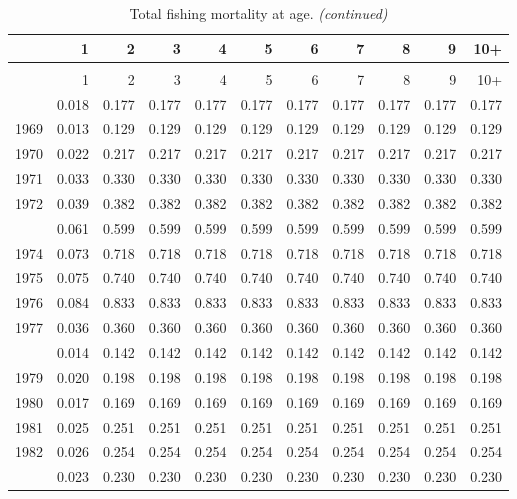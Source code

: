 \documentclass[
]{article}
\begin{document}
\begin{longtable}[t]{lrrrrrrrrrr}
\caption{\label{tab:FAA-tot-table}Total fishing mortality at age.}\\
\toprule
  & 1 & 2 & 3 & 4 & 5 & 6 & 7 & 8 & 9 & 10+\\
\midrule
\endfirsthead
\caption[]{Total fishing mortality at age. \textit{(continued)}}\\
\toprule
  & 1 & 2 & 3 & 4 & 5 & 6 & 7 & 8 & 9 & 10+\\
\midrule
\endhead

\endfoot
\bottomrule
\endlastfoot
1968 & 0.018 & 0.177 & 0.177 & 0.177 & 0.177 & 0.177 & 0.177 & 0.177 & 0.177 & 0.177\\
1969 & 0.013 & 0.129 & 0.129 & 0.129 & 0.129 & 0.129 & 0.129 & 0.129 & 0.129 & 0.129\\
1970 & 0.022 & 0.217 & 0.217 & 0.217 & 0.217 & 0.217 & 0.217 & 0.217 & 0.217 & 0.217\\
1971 & 0.033 & 0.330 & 0.330 & 0.330 & 0.330 & 0.330 & 0.330 & 0.330 & 0.330 & 0.330\\
1972 & 0.039 & 0.382 & 0.382 & 0.382 & 0.382 & 0.382 & 0.382 & 0.382 & 0.382 & 0.382\\
\addlinespace
1973 & 0.061 & 0.599 & 0.599 & 0.599 & 0.599 & 0.599 & 0.599 & 0.599 & 0.599 & 0.599\\
1974 & 0.073 & 0.718 & 0.718 & 0.718 & 0.718 & 0.718 & 0.718 & 0.718 & 0.718 & 0.718\\
1975 & 0.075 & 0.740 & 0.740 & 0.740 & 0.740 & 0.740 & 0.740 & 0.740 & 0.740 & 0.740\\
1976 & 0.084 & 0.833 & 0.833 & 0.833 & 0.833 & 0.833 & 0.833 & 0.833 & 0.833 & 0.833\\
1977 & 0.036 & 0.360 & 0.360 & 0.360 & 0.360 & 0.360 & 0.360 & 0.360 & 0.360 & 0.360\\
\addlinespace
1978 & 0.014 & 0.142 & 0.142 & 0.142 & 0.142 & 0.142 & 0.142 & 0.142 & 0.142 & 0.142\\
1979 & 0.020 & 0.198 & 0.198 & 0.198 & 0.198 & 0.198 & 0.198 & 0.198 & 0.198 & 0.198\\
1980 & 0.017 & 0.169 & 0.169 & 0.169 & 0.169 & 0.169 & 0.169 & 0.169 & 0.169 & 0.169\\
1981 & 0.025 & 0.251 & 0.251 & 0.251 & 0.251 & 0.251 & 0.251 & 0.251 & 0.251 & 0.251\\
1982 & 0.026 & 0.254 & 0.254 & 0.254 & 0.254 & 0.254 & 0.254 & 0.254 & 0.254 & 0.254\\
\addlinespace
1983 & 0.023 & 0.230 & 0.230 & 0.230 & 0.230 & 0.230 & 0.230 & 0.230 & 0.230 & 0.230\\

\end{longtable}
\end{document}
